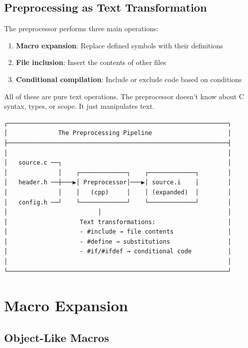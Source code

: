 \subsection{Preprocessing as Text Transformation}

The preprocessor performs three main operations:

\begin{enumerate}
    \item \textbf{Macro expansion}: Replace defined symbols with their definitions
    \item \textbf{File inclusion}: Insert the contents of other files
    \item \textbf{Conditional compilation}: Include or exclude code based on conditions
\end{enumerate}

All of these are pure text operations. The preprocessor doesn't know about C syntax, types, or scope. It just manipulates text.

\begin{verbatim}
┌─────────────────────────────────────────────────────────────┐
│              The Preprocessing Pipeline                     │
├─────────────────────────────────────────────────────────────┤
│                                                             │
│   source.c ──┐                                              │
│              │    ┌─────────────┐    ┌─────────────┐        │
│   header.h ──┼───▶│ Preprocessor│───▶│ source.i    │        │
│              │    │   (cpp)     │    │ (expanded)  │        │
│   config.h ──┘    └─────────────┘    └─────────────┘        │
│                         │                                   │
│                    Text transformations:                    │
│                    - #include → file contents               │
│                    - #define → substitutions                │
│                    - #if/#ifdef → conditional code          │
│                                                             │
└─────────────────────────────────────────────────────────────┘
\end{verbatim}

\section{Macro Expansion}

\subsection{Object-Like Macros}

